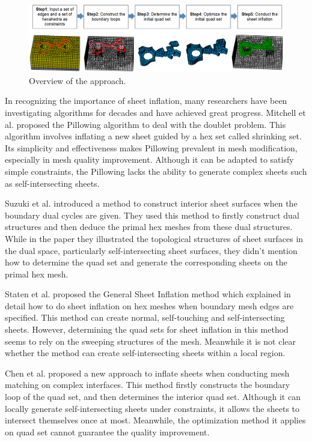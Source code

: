 \documentclass[final,5p,times,twocolumn]{elsarticle}
\begin{document}
\begin{figure}[htbp]
\begin{center}
\includegraphics[width=18cm]{figures/overview2.png}
\caption{Overview of the approach.}
\label{fig:overview}
\end{center}
\end{figure}

In recognizing the importance of sheet inflation, many researchers have been investigating algorithms for decades and have achieved great progress. Mitchell et al. proposed the Pillowing algorithm to deal with the doublet problem\cite{Mitchell:1995wa}. This algorithm involves inflating a new sheet guided by a hex set called shrinking set. Its simplicity and effectiveness makes Pillowing prevalent in mesh modification, especially in mesh quality improvement. Although it can be adapted to satisfy simple constraints, the Pillowing lacks the ability to generate complex sheets such as self-intersecting sheets.

Suzuki et al. introduced a method to construct interior sheet surfaces when the boundary dual cycles are given\cite{Suzuki:2010hn}. They used this method to firstly construct dual structures and then deduce the primal hex meshes from these dual structures. While in the paper they illustrated the topological structures of sheet surfaces in the dual space, particularly self-intersecting sheet surfaces, they didn't mention how to determine the quad set and generate the corresponding sheets on the primal hex mesh.

Staten et al. proposed the General Sheet Inflation method which explained in detail how to do sheet inflation on hex meshes when boundary mesh edges are specified\cite{Staten:2009bo}. This method can create normal, self-touching and self-intersecting sheets. However, determining the quad sets for sheet inflation in this method seems to rely on the sweeping structures of the mesh. Meanwhile it is not clear whether the method can create self-intersecting sheets within a local region.

Chen et al. proposed a new approach to inflate sheets when conducting mesh matching on complex interfaces\cite{Chen:2015kf}. This method firstly constructs the boundary loop of the quad set, and then determines the interior quad set. Although it can locally generate self-intersecting sheets under constraints, it allows the sheets to intersect themselves once at most. Meanwhile, the optimization method it applies on quad set cannot guarantee the quality improvement.
\end{document}
